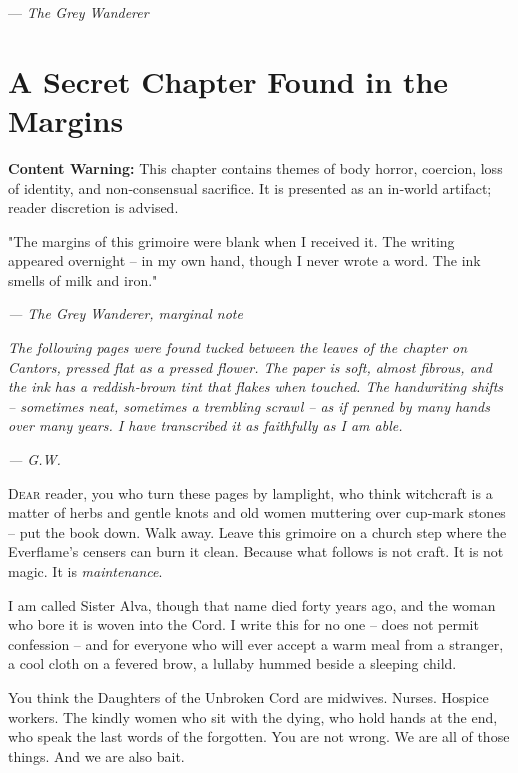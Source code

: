 \documentclass[10pt,a5paper]{book}
\begin{document}
\vspace{0.5cm}
\hfill --- \textit{The Grey Wanderer}

\chapter*{A Secret Chapter Found in the Margins}

\begin{warningbox}
\textbf{Content Warning:} This chapter contains themes of body horror, coercion, loss of identity, and non‑consensual sacrifice. It is presented as an in‑world artifact; reader discretion is advised.
\end{warningbox}

\epigraph{"The margins of this grimoire were blank when I received it. The writing appeared overnight -- in my own hand, though I never wrote a word. The ink smells of milk and iron."}{\textit{--- The Grey Wanderer, marginal note}}

\vspace{0.5cm}

\textit{The following pages were found tucked between the leaves of the chapter on Cantors, pressed flat as a pressed flower. The paper is soft, almost fibrous, and the ink has a reddish‑brown tint that flakes when touched. The handwriting shifts -- sometimes neat, sometimes a trembling scrawl -- as if penned by many hands over many years. I have transcribed it as faithfully as I am able.}

\medskip

\noindent \textit{--- G.W.}

\vspace{1cm}

\lettrine{D}{ear} reader, you who turn these pages by lamplight, who think witchcraft is a matter of herbs and gentle knots and old women muttering over cup‑mark stones -- put the book down. Walk away. Leave this grimoire on a church step where the Everflame's censers can burn it clean. Because what follows is not craft. It is not magic. It is \textit{maintenance}.

I am called Sister Alva, though that name died forty years ago, and the woman who bore it is woven into the Cord. I write this for no one -- does not permit confession -- and for everyone who will ever accept a warm meal from a stranger, a cool cloth on a fevered brow, a lullaby hummed beside a sleeping child.

You think the Daughters of the Unbroken Cord are midwives. Nurses. Hospice workers. The kindly women who sit with the dying, who hold hands at the end, who speak the last words of the forgotten. You are not wrong. We are all of those things. And we are also bait.
\end{document}
